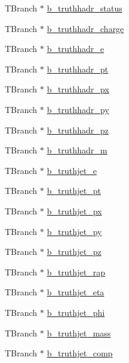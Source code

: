 \begin{DoxyCompactItemize}
T\+Branch $\ast$ \hyperlink{classXMLWriter_a87269e5640d4c04d82c535b8e2de228b}{b\+\_\+truthhadr\+\_\+status}
\item 
T\+Branch $\ast$ \hyperlink{classXMLWriter_a90ae4f5978ad2657c20c3d7c44010d07}{b\+\_\+truthhadr\+\_\+charge}
\item 
T\+Branch $\ast$ \hyperlink{classXMLWriter_a0e18c0fc5719de8ef7996ad46ef68ae0}{b\+\_\+truthhadr\+\_\+e}
\item 
T\+Branch $\ast$ \hyperlink{classXMLWriter_aeabdf2078188b2059f15f865408b688f}{b\+\_\+truthhadr\+\_\+pt}
\item 
T\+Branch $\ast$ \hyperlink{classXMLWriter_a7a06e57074e31f200f6fdd274eb75945}{b\+\_\+truthhadr\+\_\+px}
\item 
T\+Branch $\ast$ \hyperlink{classXMLWriter_acec49b2fe42203916dc17881bc71044b}{b\+\_\+truthhadr\+\_\+py}
\item 
T\+Branch $\ast$ \hyperlink{classXMLWriter_a4f0364d687ab48ec092b59645767bbac}{b\+\_\+truthhadr\+\_\+pz}
\item 
T\+Branch $\ast$ \hyperlink{classXMLWriter_a0ea126e3dbb01f1a7b41993af88d2523}{b\+\_\+truthhadr\+\_\+m}
\item 
T\+Branch $\ast$ \hyperlink{classXMLWriter_aab844dbc75091e0806b0bafdd84c29e9}{b\+\_\+truthjet\+\_\+e}
\item 
T\+Branch $\ast$ \hyperlink{classXMLWriter_aee77a554a87a94c3c8cbafc8d19b5d64}{b\+\_\+truthjet\+\_\+pt}
\item 
T\+Branch $\ast$ \hyperlink{classXMLWriter_ad4261d8bad43481a30bf5398cbf1ff2a}{b\+\_\+truthjet\+\_\+px}
\item 
T\+Branch $\ast$ \hyperlink{classXMLWriter_a47c0903ab16406e57d30f96865557fab}{b\+\_\+truthjet\+\_\+py}
\item 
T\+Branch $\ast$ \hyperlink{classXMLWriter_ac0f761dce82e488fc158b3cd7a5b7b2d}{b\+\_\+truthjet\+\_\+pz}
\item 
T\+Branch $\ast$ \hyperlink{classXMLWriter_a9d427288fb44af8e4ec3911326fb3276}{b\+\_\+truthjet\+\_\+rap}
\item 
T\+Branch $\ast$ \hyperlink{classXMLWriter_a93cbddaef85ecb8c8f2ad4d7979f43fc}{b\+\_\+truthjet\+\_\+eta}
\item 
T\+Branch $\ast$ \hyperlink{classXMLWriter_a8c30ff97f75107f4845f9bdba9f8b3d0}{b\+\_\+truthjet\+\_\+phi}
\item 
T\+Branch $\ast$ \hyperlink{classXMLWriter_a2fb4e3e39592116d5d5a85816c15426d}{b\+\_\+truthjet\+\_\+mass}
\item 
T\+Branch $\ast$ \hyperlink{classXMLWriter_af104f868c1634da906f0cdcf7fcdd2e3}{b\+\_\+truthjet\+\_\+comp}
\end{DoxyCompactItemize}


